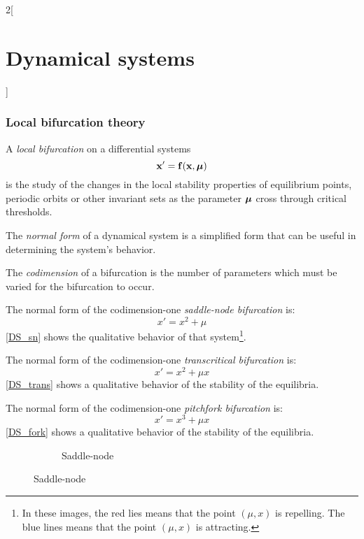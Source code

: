 \documentclass[../../../main_math.tex]{subfiles}
\begin{document}
\begin{multicols}{2}[\section{Dynamical systems}]
  \subsubsection{Local bifurcation theory}
  \begin{definition}
    A \emph{local bifurcation} on a differential systems
    \begin{equation}\label{DS_mu-system}
      \boldsymbol{\mathrm{x}}'=\boldsymbol{\mathrm{f}}(\boldsymbol{\mathrm{x}},\boldsymbol{\mathrm{\mu}})
    \end{equation}
    is the study of the changes in the local stability properties of equilibrium points, periodic orbits or other invariant sets as the parameter $\boldsymbol{\mathrm{\mu}}$ cross through critical thresholds.
  \end{definition}
  \begin{definition}
    The \emph{normal form} of a dynamical system is a simplified form that can be useful in determining the system's behavior.
  \end{definition}
  \begin{definition}
    The \emph{codimension} of a bifurcation is the number of parameters which must be varied for the bifurcation to occur.
  \end{definition}
  \begin{definition}
    The normal form of the codimension-one \emph{saddle-node bifurcation} is: $$x'=x^2+\mu$$
    \cref{DS_sn} shows the qualitative behavior of that system\footnote{In these images, the red lies means that the point $(\mu,x)$ is repelling. The blue lines means that the point $(\mu,x)$ is attracting.}.
  \end{definition}
  \begin{definition}
    The normal form of the codimension-one \emph{transcritical bifurcation} is: $$x'=x^2+\mu x$$
    \cref{DS_trans} shows a qualitative behavior of the stability of the equilibria.
  \end{definition}
  \begin{definition}
    The normal form of the codimension-one \emph{pitchfork bifurcation} is: $$x'=x^3+\mu x$$
    \cref{DS_fork} shows a qualitative behavior of the stability of the equilibria.
  \end{definition}
  \begin{figure}[H]
    \centering
    \begin{subfigure}[b]{0.32\linewidth}
      \centering
      
      \caption{Saddle-node}

\end{subfigure}
\end{figure}
\end{multicols}
\end{document}
